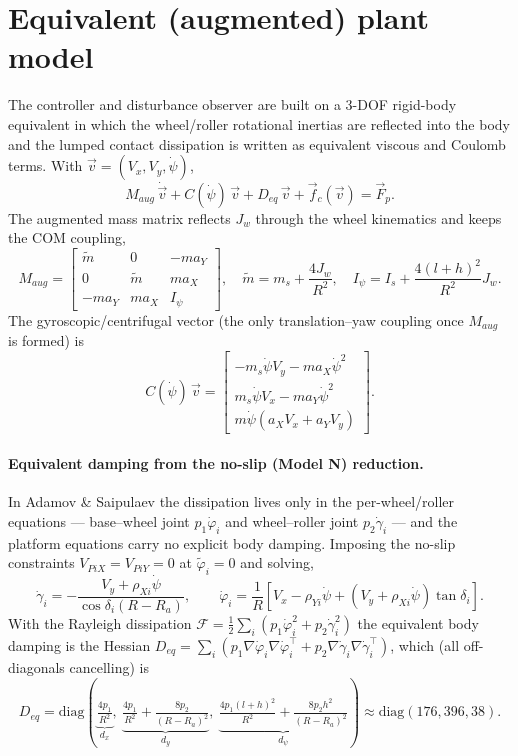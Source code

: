 \documentclass[11pt]{article}
\newcommand{\half}{\tfrac12}
\begin{document}
\section{Equivalent (augmented) plant model}
The controller and disturbance observer are built on a 3-DOF rigid-body equivalent in which
the wheel/roller rotational inertias are reflected into the body and the lumped contact
dissipation is written as equivalent viscous and Coulomb terms. With $\vec v=(V_x,V_y,\dot\psi)$,
\begin{equation}
M_{aug}\,\dot{\vec v}+C(\dot\psi)\,\vec v+D_{eq}\,\vec v+\vec f_c(\vec v)=\vec F_p .
\label{eq:plant}
\end{equation}
The augmented mass matrix reflects $J_w$ through the wheel kinematics and keeps the COM coupling,
\begin{equation}
M_{aug}=\begin{bmatrix}\tilde m&0&-ma_Y\\0&\tilde m&ma_X\\-ma_Y&ma_X&I_\psi\end{bmatrix},\quad
\tilde m=m_s+\frac{4J_w}{R^2},\quad I_\psi=I_s+\frac{4(l+h)^2}{R^2}J_w .
\label{eq:Maug}
\end{equation}
The gyroscopic/centrifugal vector (the only translation--yaw coupling once $M_{aug}$ is formed) is
\begin{equation}
C(\dot\psi)\,\vec v=\begin{bmatrix}
-m_s\dot\psi V_y-ma_X\dot\psi^2\\
m_s\dot\psi V_x-ma_Y\dot\psi^2\\
m\dot\psi(a_XV_x+a_YV_y)\end{bmatrix}.
\label{eq:Cv}
\end{equation}

\paragraph{Equivalent damping from the no-slip (Model N) reduction.} In Adamov \& Saipulaev the
dissipation lives only in the per-wheel/roller equations --- base--wheel joint $p_1\dot\varphi_i$
and wheel--roller joint $p_2\dot\gamma_i$ --- and the platform equations carry no explicit body
damping. Imposing the no-slip constraints $V_{PiX}=V_{PiY}=0$ at $\tilde\varphi_i=0$ and solving,
\begin{equation}
\dot\gamma_i=-\frac{V_y+\rho_{Xi}\dot\psi}{\cos\delta_i(R-R_a)},\qquad
\dot\varphi_i=\frac{1}{R}\!\left[V_x-\rho_{Yi}\dot\psi+(V_y+\rho_{Xi}\dot\psi)\tan\delta_i\right].
\end{equation}
With the Rayleigh dissipation $\mathcal F=\half\sum_i(p_1\dot\varphi_i^2+p_2\dot\gamma_i^2)$ the
equivalent body damping is the Hessian
$D_{eq}=\sum_i(p_1\nabla\dot\varphi_i\nabla\dot\varphi_i^\top+p_2\nabla\dot\gamma_i\nabla\dot\gamma_i^\top)$,
which (all off-diagonals cancelling) is
\begin{equation}
D_{eq}=\mathrm{diag}\!\left(\underbrace{\tfrac{4p_1}{R^2}}_{d_x},\
\underbrace{\tfrac{4p_1}{R^2}+\tfrac{8p_2}{(R-R_a)^2}}_{d_y},\
\underbrace{\tfrac{4p_1(l+h)^2}{R^2}+\tfrac{8p_2h^2}{(R-R_a)^2}}_{d_\psi}\right)\approx\mathrm{diag}(176,396,38).
\end{equation}
\end{document}
